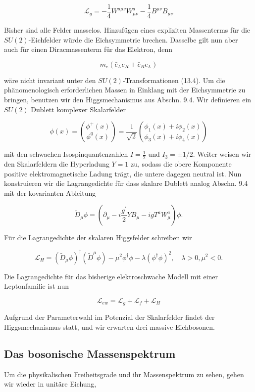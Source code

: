\documentclass[10pt, letterpaper]{article}
\begin{document}
$$
\mathscr{L}_{g}=-\frac{1}{4} W^{a \mu \nu} W_{\mu \nu}^{a}-\frac{1}{4} B^{\mu \nu} B_{\mu \nu}
$$

Bisher sind alle Felder masselos. Hinzufügen eines expliziten Massenterms für die $S U(2)$-Eichfelder würde die Eichsymmetrie brechen. Dasselbe gilt nun aber auch für einen Diracmassenterm für das Elektron, denn

$$
m_{e}\left(\bar{e}_{L} e_{R}+\bar{e}_{R} e_{L}\right)
$$

wäre nicht invariant unter den $S U(2)$-Transformationen (13.4). Um die phänomenologisch erforderlichen Massen in Einklang mit der Eichsymmetrie zu bringen, benutzen wir den Higgsmechanismus aus Abschn. 9.4. Wir definieren ein $S U(2)$ Dublett komplexer Skalarfelder

$$
\phi(x)=\binom{\phi^{+}(x)}{\phi^{0}(x)}=\frac{1}{\sqrt{2}}\binom{\phi_{1}(x)+i \phi_{2}(x)}{\phi_{3}(x)+i \phi_{4}(x)}
$$

mit den schwachen Isospinquantenzahlen $I=\frac{1}{2}$ und $I_{3}= \pm 1 / 2$. Weiter weisen wir den Skalarfeldern die Hyperladung $Y=1$ zu, sodass die obere Komponente positive elektromagnetische Ladung trägt, die untere dagegen neutral ist. Nun konstruieren wir die Lagrangedichte für dass skalare Dublett analog Abschn. 9.4 mit der kovarianten Ableitung

$$
\tilde{D}_{\mu} \phi=\left(\partial_{\mu}-i \frac{g^{\prime}}{2} Y B_{\mu}-i g T^{a} W_{\mu}^{a}\right) \phi .
$$

Für die Lagrangedichte der skalaren Higgsfelder schreiben wir

$$
\mathscr{L}_{H}=\left(\tilde{D}_{\mu} \phi\right)^{\dagger}\left(\tilde{D}^{\mu} \phi\right)-\mu^{2} \phi^{\dagger} \phi-\lambda\left(\phi^{\dagger} \phi\right)^{2}, \quad \lambda>0, \mu^{2}<0 .
$$

Die Lagrangedichte für das bisherige elektroschwache Modell mit einer Leptonfamilie ist nun

$$
\mathscr{L}_{e w}=\mathscr{L}_{g}+\mathscr{L}_{f}+\mathscr{L}_{H}
$$

Aufgrund der Parameterwahl im Potenzial der Skalarfelder findet der Higgsmechanismus statt, und wir erwarten drei massive Eichbosonen.

\subsection*{Das bosonische Massenspektrum}
Um die physikalischen Freiheitsgrade und ihr Massenspektrum zu sehen, gehen wir wieder in unitäre Eichung,
\end{document}
